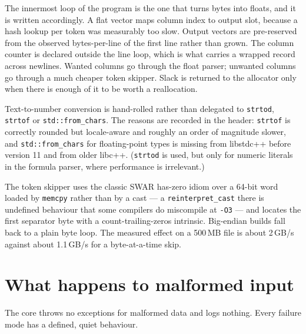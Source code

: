 \documentclass[11pt,a4paper,oneside]{report}
\newcommand{\code}[1]{\texttt{#1}}
\begin{document}
The innermost loop of the program is the one that turns bytes into floats, and it
is written accordingly. A flat vector maps column index to output slot, because a
hash lookup per token was measurably too slow. Output vectors are pre-reserved
from the observed bytes-per-line of the first line rather than grown. The column
counter is declared outside the line loop, which is what carries a wrapped record
across newlines. Wanted columns go through the float parser; unwanted columns go
through a much cheaper token skipper. Slack is returned to the allocator only
when there is enough of it to be worth a reallocation.

Text-to-number conversion is hand-rolled rather than delegated to
\code{strtod}, \code{strtof} or \code{std::from\_chars}. The reasons are recorded
in the header: \code{strtof} is correctly rounded but locale-aware and roughly an
order of magnitude slower, and \code{std::from\_chars} for floating-point types
is missing from libstdc++ before version 11 and from older libc++.
(\code{strtod} is used, but only for numeric literals in the formula parser,
where performance is irrelevant.)

The token skipper uses the classic SWAR has-zero idiom over a 64-bit word loaded
by \code{memcpy} rather than by a cast --- a \code{reinterpret\_cast} there is
undefined behaviour that some compilers do miscompile at \code{-O3} --- and
locates the first separator byte with a count-trailing-zeros intrinsic.
Big-endian builds fall back to a plain byte loop. The measured effect on a
500\,MB file is about 2\,GB/s against about 1.1\,GB/s for a byte-at-a-time skip.

\section{What happens to malformed input}

The core throws no exceptions for malformed data and logs nothing. Every failure
mode has a defined, quiet behaviour.
\end{document}
